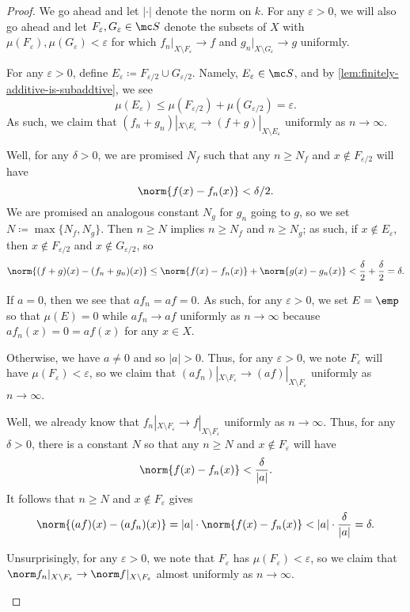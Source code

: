 \documentclass[../notes.tex]{subfiles}
\begin{document}
\begin{proof}
	We go ahead and let $|\cdot|$ denote the norm on $k$. For any $\varepsilon>0$, we will also go ahead and let $F_\varepsilon,G_\varepsilon\in\mc S$ denote the subsets of $X$ with $\mu(F_\varepsilon),\mu(G_\varepsilon)<\varepsilon$ for which $f_n|_{X\setminus F_\varepsilon}\to f$ and $g_n|_{X\setminus G_\varepsilon}\to g$ uniformly.
	\begin{listalph}
		\item For any $\varepsilon>0$, define $E_\varepsilon\coloneqq F_{\varepsilon/2}\cup G_{\varepsilon/2}$. Namely, $E_\varepsilon\in\mc S$, and by \autoref{lem:finitely-additive-is-subaddtive}, we see
		\[\mu(E_\varepsilon)\le\mu(F_{\varepsilon/2})+\mu(G_{\varepsilon/2})=\varepsilon.\]
		As such, we claim that $(f_n+g_n)|_{X\setminus E_\varepsilon}\to(f+g)|_{X\setminus E_\varepsilon}$ uniformly as $n\to\infty$.

		Well, for any $\delta>0$, we are promised $N_f$ such that any $n\ge N_f$ and $x\notin F_{\varepsilon/2}$ will have
		\[\norm{f(x)-f_n(x)}<\delta/2.\]
		We are promised an analogous constant $N_g$ for $g_n$ going to $g$, so we set $N\coloneqq\max\{N_f,N_g\}$. Then $n\ge N$ implies $n\ge N_f$ and $n\ge N_g$; as such, if $x\notin E_\varepsilon$, then $x\notin F_{\varepsilon/2}$ and $x\notin G_{\varepsilon/2}$, so
		\[\norm{(f+g)(x)-(f_n+g_n)(x)}\le\norm{f(x)-f_n(x)}+\norm{g(x)-g_n(x)}<\frac\delta2+\frac\delta2=\delta.\]

		\item If $a=0$, then we see that $af_n=af=0$. As such, for any $\varepsilon>0$, we set $E=\emp$ so that $\mu(E)=0$ while $af_n\to af$ uniformly as $n\to\infty$ because $af_n(x)=0=af(x)$ for any $x\in X$.

		Otherwise, we have $a\ne0$ and so $|a|>0$. Thus, for any $\varepsilon>0$, we note $F_\varepsilon$ will have $\mu(F_\varepsilon)<\varepsilon$, so we claim that $(af_n)|_{X\setminus F_\varepsilon}\to(af)|_{X\setminus F_\varepsilon}$ uniformly as $n\to\infty$.

		Well, we already know that $f_n|_{X\setminus F_\varepsilon}\to f|_{X\setminus F_\varepsilon}$ uniformly as $n\to\infty$. Thus, for any $\delta>0$, there is a constant $N$ so that any $n\ge N$ and $x\notin F_\varepsilon$ will have
		\[\norm{f(x)-f_n(x)}<\frac\delta{|a|}.\]
		It follows that $n\ge N$ and $x\notin F_\varepsilon$ gives
		\[\norm{(af)(x)-(af_n)(x)}=|a|\cdot\norm{f(x)-f_n(x)}<|a|\cdot\frac\delta{|a|}=\delta.\]

		\item Unsurprisingly, for any $\varepsilon>0$, we note that $F_\varepsilon$ has $\mu(F_\varepsilon)<\varepsilon$, so we claim that $\norm f_n|_{X\setminus F_\varepsilon}\to\norm f|_{X\setminus F_\varepsilon}$ almost uniformly as $n\to\infty$.


\end{listalph}
\end{proof}
\end{document}
